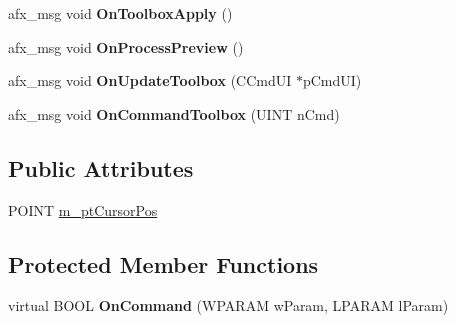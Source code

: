 \begin{DoxyCompactItemize}
\mbox{\label{class_work_view_a4d3c4931b25cfdaf1068d8d3e40fd285}} 
afx\+\_\+msg void {\bfseries On\+Toolbox\+Apply} ()
\item 
\mbox{\label{class_work_view_a9a92da21e55e9f8a86bdf1100bc91047}} 
afx\+\_\+msg void {\bfseries On\+Process\+Preview} ()
\item 
\mbox{\label{class_work_view_a98b3f9ac9bea52d9bbc3e2ecaffdf78b}} 
afx\+\_\+msg void {\bfseries On\+Update\+Toolbox} (C\+Cmd\+UI $\ast$p\+Cmd\+UI)
\item 
\mbox{\label{class_work_view_af3a6f050b573a4eb9c5dd1dc95cc7f68}} 
afx\+\_\+msg void {\bfseries On\+Command\+Toolbox} (U\+I\+NT n\+Cmd)
\end{DoxyCompactItemize}
\subsection*{Public Attributes}
\begin{DoxyCompactItemize}
\item 
P\+O\+I\+NT \mbox{\hyperlink{class_work_view_ac4c6b3ea30ed20afd8fc96dc9be9a5b6}{m\+\_\+pt\+Cursor\+Pos}}
\end{DoxyCompactItemize}
\subsection*{Protected Member Functions}
\begin{DoxyCompactItemize}
\item 
\mbox{\label{class_work_view_a66b822a6f10fe9b452faa3d1675cc3d4}} 
virtual B\+O\+OL {\bfseries On\+Command} (W\+P\+A\+R\+AM w\+Param, L\+P\+A\+R\+AM l\+Param)
\end{DoxyCompactItemize}
